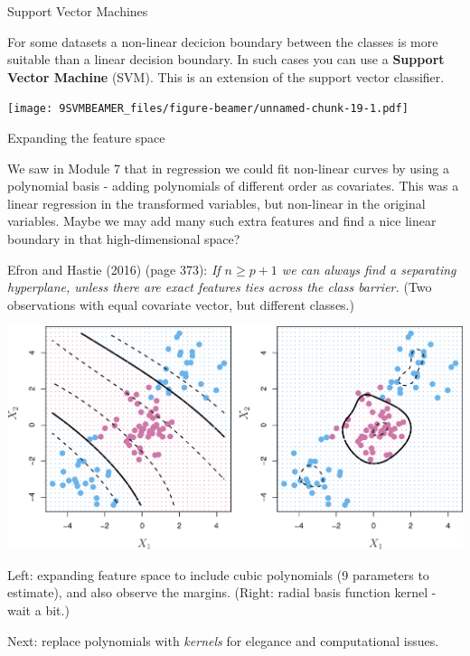 \documentclass[ignorenonframetext,]{beamer}
\begin{document}
\begin{frame}{Support Vector Machines}

For some datasets a non-linear decicion boundary between the classes is
more suitable than a linear decision boundary. In such cases you can use
a \textbf{Support Vector Machine} (SVM). This is an extension of the
support vector classifier.

\texttt{[image: 9SVMBEAMER\_files/figure-beamer/unnamed-chunk-19-1.pdf]}

\end{frame}

\begin{frame}

\begin{block}{Expanding the feature space}

We saw in Module 7 that in regression we could fit non-linear curves by
using a polynomial basis - adding polynomials of different order as
covariates. This was a linear regression in the transformed variables,
but non-linear in the original variables. Maybe we may add many such
extra features and find a nice linear boundary in that high-dimensional
space?

Efron and Hastie (2016) (page 373): \emph{If \(n \ge p+1\) we can always
find a separating hyperplane, unless there are exact features ties
across the class barrier.} (Two observations with equal covariate
vector, but different classes.)

\end{block}

\end{frame}

\begin{frame}

\includegraphics{../ISLR/Chapter9/9.9.png}

Left: expanding feature space to include cubic polynomials (9 parameters
to estimate), and also observe the margins. (Right: radial basis
function kernel - wait a bit.)

Next: replace polynomials with \emph{kernels} for elegance and
computational issues.

\end{frame}
\end{document}
